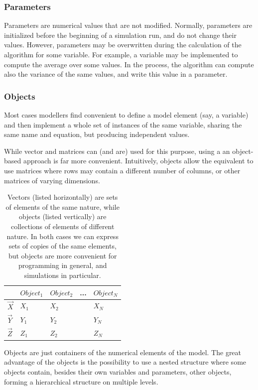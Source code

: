 \documentclass [11pt,a4paper] {book}
\begin{document}
\subsubsection{Parameters}
Parameters are numerical values that are not modified. Normally, parameters are
initialized before the beginning of a simulation run, and do not change their values.
However, parameters may be overwritten during the calculation of the algorithm for some
variable. For example, a variable may be implemented to compute the average over some
values. In the process, the algorithm can compute also the variance of the same values,
and write this value in a parameter. 


\subsubsection{Objects}
Most cases modellers find convenient to define a model element (say, a variable) and then implement a whole set of instances of the same variable, sharing the same name and equation, but producing independent values.

While vector and matrices can (and are) used for this purpose, using a an object-based approach is far more convenient. Intuitively, objects allow the equivalent to use matrices where rows may contain a different number of columns, or other matrices of varying dimensions.

\begin{table}[h]
\centering
\begin{tabular}{|l||l|l|l|l|}
\hline
 & $Object_1$ & $Object_2$ & ... & $Object_N$ \\ \hline \hline
$\vec{X}$ & $X_1$ & $X_2$ & & $X_N$ \\ \hline
$\vec{Y}$ & $Y_1$ & $Y_2$ & & $Y_N$ \\ \hline
$\vec{Z}$ & $Z_1$ & $Z_2$ & & $Z_N$ \\ \hline
\end{tabular}
\caption{\small Vectors (listed horizontally) are sets of elements of the same nature, while objects (listed vertically) are collections of elements of different nature. In both cases we can express sets of copies of the same elements, but objects are more convenient for programming in general, and simulations in particular.}
\label{tab:vecObj}
\end{table}


Objects are just containers of the numerical elements of the model. The great advantage
of the objects is the possibility to use a nested structure where some objects contain,
besides their own variables and parameters, other objects, forming a hierarchical
structure on multiple levels.
\end{document}

